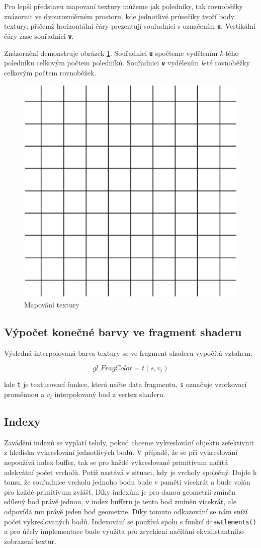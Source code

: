\newpage

Pro lepší představu mapovaní textury můžeme jak poledníky, tak rovnoběžky znázornit ve dvourozměrném prostoru, kde jednotlivé průsečíky tvoří body textury, přičemž horizontální čáry prezentují souřadnici s označením \texttt{\textbf{u}}. Vertikální čáry zase souřadnici \texttt{\textbf{v}}. 

Znázornění demonstruje obrázek \ref{img:grid}. Souřadnici \texttt{\textbf{u}} spočteme vydělením \textit{k}-tého poledníku celkovým počtem poledníků. Souřadnici \texttt{\textbf{v}} vydělením \textit{k}-té rovnoběžky celkovým počtem rovnoběžek.

\begin{figure}[h]
	\label{img:grid}
	\centering
	\includegraphics[scale=1.0,angle=0,width=0.35\linewidth]{obrazky-figures/grid}
	\caption{Mapování textury}
\end{figure}

\subsection*{Výpočet konečné barvy ve fragment shaderu}
Výsledná interpolovaná barva textury se ve fragment shaderu vypočítá vztahem:

$$ gl\_FragColor = t(s, v_{t}) $$ 

kde \texttt{t} je texturovací funkce, která načte data fragmentu, \texttt{s} označuje vzorkovací proměnnou a $v_{t}$ interpolovaný bod z vertex shaderu.


\subsection{Indexy}
Zavádění indexů se vyplatí tehdy, pokud chceme vykreslování objektu zefektivnit z hlediska vykreslování jednotlivých bodů. V případě, že se při vykreslování nepoužívá index buffer, tak se pro každé vykreslované primitivum načítá adekvátní počet vrcholů. Potíž nastává v situaci, kdy je vrcholy společný. Dojde k tomu, že souřadnice vrcholu jednoho bodu bude v paměti vícekrát a bude volán pro každé primitivum zvlášť. Díky indexům je pro danou geometrii zmíněn sdílený bod právě jednou, v index bufferu je tento bod zmíněn vícekrát, ale odpovídá mu právě jeden bod geometrie. Díky tomuto odkazování se nám sníží počet vykreslovaných bodů. Indexování se používá spolu s funkcí \texttt{drawElements()} a pro účely implementace bude využita pro zrychlení načítání ekvidistantního zobrazení textur.

